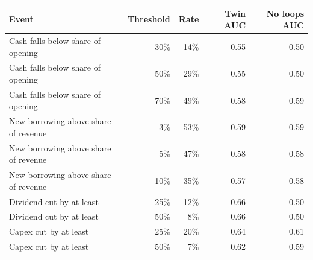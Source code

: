 \begin{tabular}{lrrrr}
\toprule
Event & Threshold & Rate & Twin AUC & No loops AUC \\
\midrule
Cash falls below share of opening & 30\% & 14\% & 0.55 & 0.50 \\
Cash falls below share of opening & 50\% & 29\% & 0.55 & 0.50 \\
Cash falls below share of opening & 70\% & 49\% & 0.58 & 0.59 \\
New borrowing above share of revenue & 3\% & 53\% & 0.59 & 0.59 \\
New borrowing above share of revenue & 5\% & 47\% & 0.58 & 0.58 \\
New borrowing above share of revenue & 10\% & 35\% & 0.57 & 0.58 \\
Dividend cut by at least & 25\% & 12\% & 0.66 & 0.50 \\
Dividend cut by at least & 50\% & 8\% & 0.66 & 0.50 \\
Capex cut by at least & 25\% & 20\% & 0.64 & 0.61 \\
Capex cut by at least & 50\% & 7\% & 0.62 & 0.59 \\
\bottomrule
\end{tabular}
